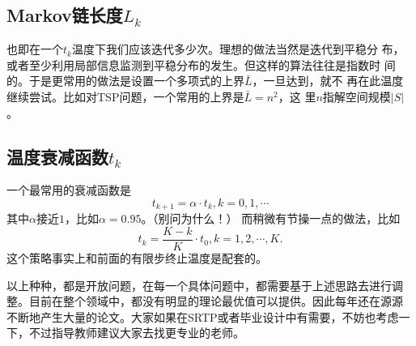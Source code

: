 \subsection{Markov链长度$L_k$}
也即在一个$t_k$温度下我们应该迭代多少次。理想的做法当然是迭代到平稳分
布，或者至少利用局部信息监测到平稳分布的发生。但这样的算法往往是指数时
间的。于是更常用的做法是设置一个多项式的上界$\bar{L}$，一旦达到，就不
再在此温度继续尝试。比如对TSP问题，一个常用的上界是$\bar{L} = n^2$，这
里$n$指解空间规模$|S|$。

\subsection{温度衰减函数$t_k$}
一个最常用的衰减函数是
\begin{equation}
  t_{k + 1} = \alpha \cdot t_k, k = 0, 1, \cdots
\end{equation}
其中$\alpha$接近$1$，比如$\alpha = 0.95$。（别问为什么！）
而稍微有节操一点的做法，比如
\begin{equation}
  t_k = \frac{K - k}{K} \cdot t_0, k = 1, 2, \cdots, K.
\end{equation}
这个策略事实上和前面的有限步终止温度是配套的。

以上种种，都是开放问题，在每一个具体问题中，都需要基于上述思路去进行调
整。目前在整个领域中，都没有明显的理论最优值可以提供。因此每年还在源源
不断地产生大量的论文。大家如果在SRTP或者毕业设计中有需要，不妨也考虑一
下，不过指导教师建议大家去找更专业的老师。


